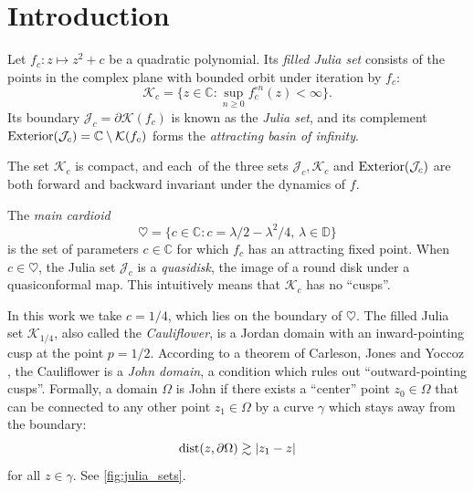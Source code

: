 

\usepackage{subcaption}



\section{Introduction}

% 

Let $f_c: z\mapsto z^2 + c$ be a quadratic polynomial. Its {\em filled Julia set} consists of the points in the complex plane with bounded orbit
under iteration by $f_c$:
$$
\mathcal K_c = \{z \in \mathbb{C} : \sup_{n \ge 0} f_c^{\circ n}(z) < \infty \}.
$$
Its boundary $\mathcal J_c = \partial \mathcal K(f_c)$ is known as the {\em Julia set}, and its complement $\operatorname{Exterior}(\mathcal{J}_c) = \mathbb{C} \setminus \mathcal K(f_c)$ forms the {\em attracting basin of infinity}. 

The set $\mathcal K_c$ is compact, and each\
  of the three sets
$\mathcal J_c, \mathcal K_c$ and $\operatorname{Exterior}(\mathcal{J}_c)$ are both forward and backward invariant under the dynamics of $f$.
 
The {\em main cardioid}
$$
\heartsuit = \bigl  \{c \in \mathbb{C}: c = \lambda/2 - \lambda^2/4,\, \lambda \in \mathbb{D} \bigr \}
$$
is the set of parameters $c \in \mathbb{C}$ for which $f_c$ has an attracting fixed point.
When $c \in \heartsuit$, the Julia set $\mathcal J_c$ is a \emph{quasidisk}, the image of a round disk under a quasiconformal map.
This intuitively means that $\mathcal K_c$ has no \enquote{cusps}.


In this work we take $c=1/4$, which lies on the boundary of $\heartsuit$. 
The filled Julia set $\mathcal K_{1/4}$, also called the \emph{Cauliflower}, 
is a Jordan domain with an inward-pointing cusp at the point $p=1/2$. According to a theorem of Carleson, Jones and Yoccoz \cite[Theorem 6.1]{carleson_julia_1994}, 
the Cauliflower is a \emph{John domain}, a condition which rules out \enquote{outward-pointing cusps}. 
Formally, a domain $\Omega$ is John if there exists a \enquote{center} point 
$z_0 \in \Omega$ that can be connected 
to any other point $z_1\in \Omega$ by a curve $\gamma$ which stays away from the boundary:
\begin{equation}
	\operatorname{dist}(z, \partial \Omega) \gtrsim |z_1-z|
\end{equation} for all $z\in \gamma$.
 See \cref{fig:julia_sets}.

